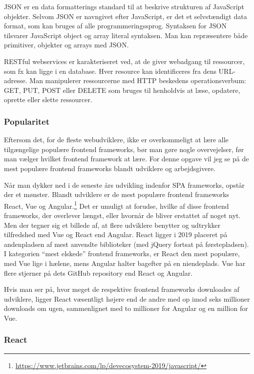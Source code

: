 \documentclass[]{article}
\begin{document}
JSON er en data formatterings standard til at beskrive strukturen af
JavaScript objekter. Selvom JSON er navngivet efter JavaScript, er det
et selvstændigt data format, som kan bruges af alle programmeringssprog.
Syntaksen for JSON tilsvarer JavaScript object og array literal
syntaksen. Man kan repræsentere både primitiver, objekter og arrays med
JSON.

RESTful webservices er karakteriseret ved, at de giver webadgang til
ressourcer, som fx kan ligge i en database. Hver resource kan
identificeres fra dens URL-adresse. Man manipulerer ressourcerne med
HTTP beskedens operationsverbum: GET, PUT, POST eller DELETE som bruges
til henholdvis at læse, opdatere, oprette eller slette ressourcer.

\hypertarget{popularitet}{%
\subsubsection{Popularitet}\label{popularitet}}

Eftersom det, for de fleste webudviklere, ikke er overkommeligt at lære
alle tilgængelige populære frontend frameworks, bør man gøre nogle
overvejelser, før man vælger hvilket frontend framework at lære. For
denne opgave vil jeg se på de mest populære frontend frameworks blandt
udviklere og arbejdsgivere.

Når man dykker ned i de seneste års udvikling indenfor SPA frameworks,
opstår der et mønster. Blandt udviklere er de mest populære frontend
frameworks React, Vue og Angular.\footnote{\url{https://www.jetbrains.com/lp/devecosystem-2019/javascript/}}
Det er umuligt at forudse, hvilke af disse frontend frameworks, der
overlever længst, eller hvornår de bliver erstattet af noget nyt. Men
der tegner sig et billede af, at flere udviklere benytter og udtrykker
tilfredshed med Vue og React end Angular. React ligger i 2019 placeret
på andenpladsen af mest anvendte biblioteker (med jQuery fortsat på
førstepladsen). I kategorien ``mest elskede'' frontend frameworks, er
React den mest populære, med Vue lige i hælene, mens Angular halter
bagefter på en niendeplads. Vue har flere stjerner på dets GitHub
repository end React og Angular.

Hvis man ser på, hvor meget de respektive frontend frameworks downloades
af udviklere, ligger React væsentligt højere end de andre med op imod
seks millioner downloads om ugen, sammenlignet med to millioner for
Angular og en million for Vue.

\hypertarget{react}{%
\subsubsection{React}\label{react}}
\end{document}
